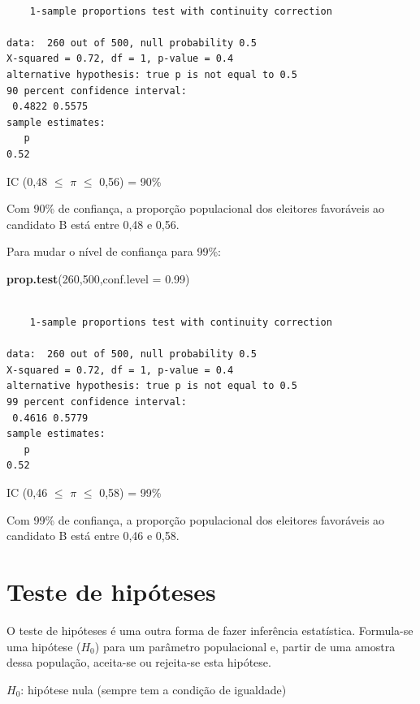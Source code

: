 \documentclass[12pt,brazil,oneside]{book}
\newenvironment{Shaded}{\begin{snugshade}}{\end{snugshade}}
\newcommand{\DataTypeTok}[1]{\textcolor[rgb]{0.13,0.29,0.53}{#1}}
\newcommand{\DecValTok}[1]{\textcolor[rgb]{0.00,0.00,0.81}{#1}}
\newcommand{\FloatTok}[1]{\textcolor[rgb]{0.00,0.00,0.81}{#1}}
\newcommand{\KeywordTok}[1]{\textcolor[rgb]{0.13,0.29,0.53}{\textbf{#1}}}
\newcommand{\NormalTok}[1]{#1}
\begin{document}
\begin{verbatim}

    1-sample proportions test with continuity correction

data:  260 out of 500, null probability 0.5
X-squared = 0.72, df = 1, p-value = 0.4
alternative hypothesis: true p is not equal to 0.5
90 percent confidence interval:
 0.4822 0.5575
sample estimates:
   p 
0.52 
\end{verbatim}

IC (0,48 \(\leq\) \(\pi\) \(\leq\) 0,56) = 90\%

Com 90\% de confiança, a proporção populacional dos eleitores favoráveis ao candidato B está entre 0,48 e 0,56.

Para mudar o nível de confiança para 99\%:

\begin{Shaded}
\begin{Highlighting}[]
\KeywordTok{prop.test}\NormalTok{(}\DecValTok{260}\NormalTok{,}\DecValTok{500}\NormalTok{,}\DataTypeTok{conf.level =} \FloatTok{0.99}\NormalTok{)}
\end{Highlighting}
\end{Shaded}

\begin{verbatim}

    1-sample proportions test with continuity correction

data:  260 out of 500, null probability 0.5
X-squared = 0.72, df = 1, p-value = 0.4
alternative hypothesis: true p is not equal to 0.5
99 percent confidence interval:
 0.4616 0.5779
sample estimates:
   p 
0.52 
\end{verbatim}

IC (0,46 \(\leq\) \(\pi\) \(\leq\) 0,58) = 99\%

Com 99\% de confiança, a proporção populacional dos eleitores favoráveis ao candidato B está entre 0,46 e 0,58.

\hypertarget{teste-de-hipoteses}{%
\section{Teste de hipóteses}\label{teste-de-hipoteses}}

O teste de hipóteses é uma outra forma de fazer inferência estatística. Formula-se uma hipótese (\(H_0\)) para um parâmetro populacional e, partir de uma amostra dessa população, aceita-se ou rejeita-se esta hipótese.

\textbf{\(H_0\)}: hipótese nula (sempre tem a condição de igualdade)
\end{document}
